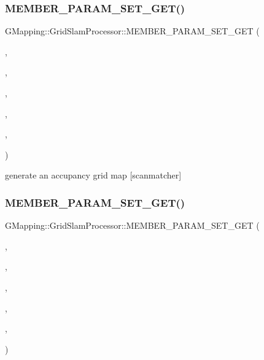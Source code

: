\subsubsection{\texorpdfstring{M\+E\+M\+B\+E\+R\+\_\+\+P\+A\+R\+A\+M\+\_\+\+S\+E\+T\+\_\+\+G\+E\+T()}{MEMBER\_PARAM\_SET\_GET()}\hspace{0.1cm}{\footnotesize\ttfamily [14/16]}}
{\footnotesize\ttfamily G\+Mapping\+::\+Grid\+Slam\+Processor\+::\+M\+E\+M\+B\+E\+R\+\_\+\+P\+A\+R\+A\+M\+\_\+\+S\+E\+T\+\_\+\+G\+ET (\begin{DoxyParamCaption}\item[{\hyperlink{classGMapping_1_1GridSlamProcessor_ac50952d259590c4aeba22eee4e6437f5}{m\+\_\+matcher}}]{,  }\item[{bool}]{,  }\item[{generate\+Map}]{,  }\item[{protected}]{,  }\item[{public}]{,  }\item[{public}]{ }\end{DoxyParamCaption})}

generate an accupancy grid map \mbox{[}scanmatcher\mbox{]} \mbox{\label{classGMapping_1_1GridSlamProcessor_ad7e50913d07e1003d2fb97b40b3768aa}} 
\subsubsection{\texorpdfstring{M\+E\+M\+B\+E\+R\+\_\+\+P\+A\+R\+A\+M\+\_\+\+S\+E\+T\+\_\+\+G\+E\+T()}{MEMBER\_PARAM\_SET\_GET()}\hspace{0.1cm}{\footnotesize\ttfamily [15/16]}}
{\footnotesize\ttfamily G\+Mapping\+::\+Grid\+Slam\+Processor\+::\+M\+E\+M\+B\+E\+R\+\_\+\+P\+A\+R\+A\+M\+\_\+\+S\+E\+T\+\_\+\+G\+ET (\begin{DoxyParamCaption}\item[{\hyperlink{classGMapping_1_1GridSlamProcessor_ac50952d259590c4aeba22eee4e6437f5}{m\+\_\+matcher}}]{,  }\item[{bool}]{,  }\item[{enlarge\+Step}]{,  }\item[{protected}]{,  }\item[{public}]{,  }\item[{public}]{ }\end{DoxyParamCaption})}


